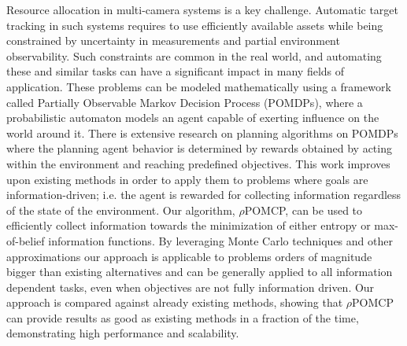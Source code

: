Resource allocation in multi-camera systems is a key challenge. Automatic target tracking in such
systems requires to use efficiently available assets while being constrained by uncertainty in
measurements and partial environment observability. Such constraints are common in the real world,
and automating these and similar tasks can have a significant impact in many fields of application.
These problems can be modeled mathematically using a framework called Partially Observable Markov
Decision Process (POMDPs), where a probabilistic automaton models an agent capable of exerting
influence on the world around it. There is extensive research on planning algorithms on POMDPs where
the planning agent behavior is determined by rewards obtained by acting within the environment and
reaching predefined objectives. This work improves upon existing methods in order to apply them to
problems where goals are information-driven; i.e. the agent is rewarded for collecting information
regardless of the state of the environment. Our algorithm, $\rho$POMCP, can be used to efficiently
collect information towards the minimization of either entropy or max-of-belief information
functions. By leveraging Monte Carlo techniques and other approximations our approach is applicable
to problems orders of magnitude bigger than existing alternatives and can be generally applied to
all information dependent tasks, even when objectives are not fully information driven. Our approach
is compared against already existing methods, showing that $\rho$POMCP can provide results as good
as existing methods in a fraction of the time, demonstrating high performance and scalability.
